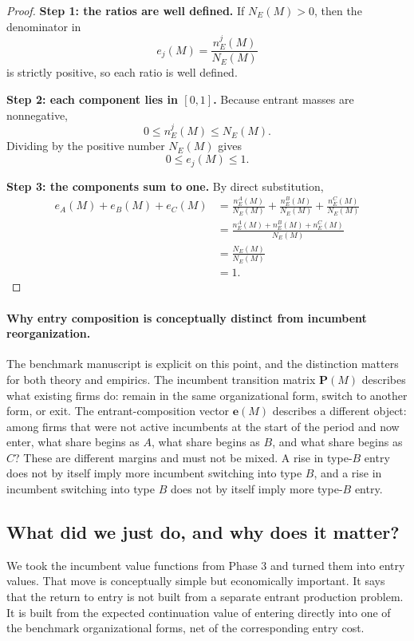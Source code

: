 \begin{proof}
\medskip\noindent\textbf{Step 1: the ratios are well defined.}
If $N_E(M)>0$, then the denominator in
\[
e_j(M)=\frac{n_E^j(M)}{N_E(M)}
\]
is strictly positive, so each ratio is well defined.

\medskip\noindent\textbf{Step 2: each component lies in $[0,1]$.}
Because entrant masses are nonnegative,
\[
0\le n_E^j(M)\le N_E(M).
\]
Dividing by the positive number $N_E(M)$ gives
\[
0\le e_j(M)\le 1.
\]

\medskip\noindent\textbf{Step 3: the components sum to one.}
By direct substitution,
\begin{align*}
e_A(M)+e_B(M)+e_C(M)
&=
\frac{n_E^A(M)}{N_E(M)}
+
\frac{n_E^B(M)}{N_E(M)}
+
\frac{n_E^C(M)}{N_E(M)}\\
&=
\frac{n_E^A(M)+n_E^B(M)+n_E^C(M)}{N_E(M)}\\
&=
\frac{N_E(M)}{N_E(M)}\\
&=1.
\end{align*}
\end{proof}

\paragraph{Why entry composition is conceptually distinct from incumbent reorganization.}
The benchmark manuscript is explicit on this point, and the distinction matters for both theory and empirics. The incumbent transition matrix $\mathbf P(M)$ describes what existing firms do: remain in the same organizational form, switch to another form, or exit. The entrant-composition vector $\mathbf e(M)$ describes a different object: among firms that were not active incumbents at the start of the period and now enter, what share begins as $A$, what share begins as $B$, and what share begins as $C$? These are different margins and must not be mixed. A rise in type-$B$ entry does not by itself imply more incumbent switching into type $B$, and a rise in incumbent switching into type $B$ does not by itself imply more type-$B$ entry.

\subsection{What did we just do, and why does it matter?}

We took the incumbent value functions from Phase 3 and turned them into entry values. That move is conceptually simple but economically important. It says that the return to entry is not built from a separate entrant production problem. It is built from the expected continuation value of entering directly into one of the benchmark organizational forms, net of the corresponding entry cost.


